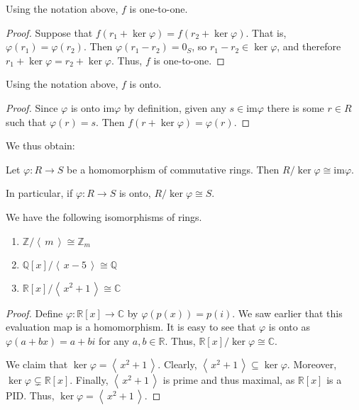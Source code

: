 \documentclass[english,course]{lecture}
\newcommand{\ideal}[1]{\left\langle\, #1 \,\right\rangle}
\def\p{\varphi}
\def\im{\text{im}}
\theoremstyle{plain}
\def\C{{\mathbb C}}
\def\Z{{\mathbb Z}}
\def\Q{{\mathbb Q}}
\def\R{{\mathbb R}}
\def\presnotes{}
\begin{document}

\begin{lemma}
	Using the notation above, $f$ is one-to-one.
\end{lemma}

\begin{proof}
Suppose that $f(r_1 + \ker\p) = f(r_2 + \ker\p)$. 
	That is, $\p(r_1) = \p(r_2)$.
	Then $\p(r_1 - r_2) = 0_S$, so $r_1 -r_2 \in \ker\p$, and therefore $r_1 + \ker\p = r_2 + \ker \p$.
	Thus, $f$ is one-to-one.
\end{proof}



\begin{lemma}
	Using the notation above, $f$ is onto.
\end{lemma}

\begin{proof}
Since $\p$ is onto $\im \p$ by definition, given any $s\in \im \p$ there is some $r\in R$ such that $\p(r) = s$.
	Then $f(r+\ker\p) = \p(r)$.
\end{proof}


We thus obtain:

\begin{unnumberedtheorem}
	Let $\p : R\to S$ be a  homomorphism of commutative rings.
	Then $R/\ker \p \cong \im \p$.
	
	In particular, if $\p : R\to S$ is onto, $R/\ker \p \cong S$.
\end{unnumberedtheorem}




\begin{theorem}
	We have the following isomorphisms of rings.
	\begin{enumerate}
		\item $\Z/\ideal{m} \cong \Z_m$
		\item $\Q[x]/\ideal{x-5} \cong \Q$
		\item $\R[x]/\ideal{x^2+1} \cong \C$
	\end{enumerate}
\end{theorem}

\begin{proof}
	Define $\p: \R[x] \to \C$ by $\p(p(x)) = p(i)$.
	We saw earlier that this evaluation map is a homomorphism.
	It is easy to see that $\p$ is onto as $\p(a+bx) = a+bi$ for any $a,b\in \R$.
	Thus, $\R[x]/\ker\p \cong \C$.
	
	We claim that $\ker\p = \ideal{x^2+1}$.
	Clearly, $\ideal{x^2+1} \subseteq \ker\p$.
	Moreover, $\ker\p \subsetneq \R[x]$.
	Finally, $\ideal{x^2+1}$ is prime and thus maximal, as $\R[x]$ is a PID.
	Thus, $\ker\p = \ideal{x^2+1}$.
\end{proof}






\printindex


\clearpage


{}

\end{document}
